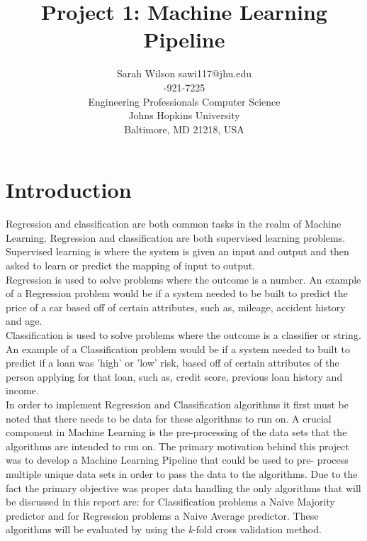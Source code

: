 \documentclass[twoside,11pt]{article}
\begin{document}
\title{Project 1: Machine Learning Pipeline}

\author{\name Sarah Wilson 
	   \email sawi117@jhu.edu \\
	   -921-7225 \\
       \addr Engineering Professionals Computer Science\\
       Johns Hopkins University\\
       Baltimore, MD 21218, USA} 

\maketitle


\section{Introduction}
Regression and classification are both common tasks in the realm of Machine Learning. Regression and classification are both supervised learning problems. Supervised learning is where the system is given an input and output and then asked to learn or predict the mapping of input to output.\\ 
\hspace*{10mm} Regression is used to solve problems where the outcome is a number. An example of a Regression problem would be if a system needed to be built to predict the price of a car based off of certain attributes, such as, mileage, accident history and age.\\
\hspace*{10mm} Classification is used to solve problems where the outcome is a classifier or string. An example of a Classification problem would be if a system needed to built to predict if a loan was 'high' or 'low' risk, based off of certain attributes of the person applying for that loan, such as, credit score, previous loan history and income.\\ 
\hspace*{10mm} In order to implement Regression and Classification algorithms it first must be noted that there needs to be data for these algorithms to run on. A crucial component in Machine Learning is the pre-processing of the data sets that the algorithms are intended to run on. The primary motivation behind this project was to develop a Machine Learning Pipeline that could be used to pre- process multiple unique data sets in order to pass the data to the algorithms. Due to the fact the primary objective was proper data handling the only algorithms that will be discussed in this report are: for Classification problems a Naive Majority predictor and for Regression problems a Naive Average predictor. These algorithms will be evaluated by using the \textit{k}-fold cross validation method.\\
\end{document}
